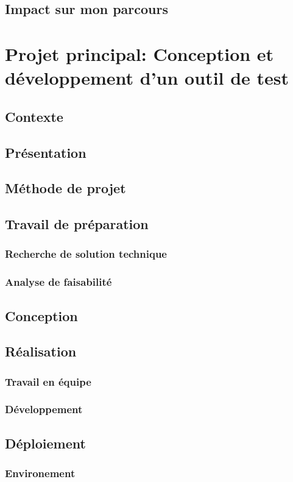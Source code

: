 \documentclass[12pt,a4paper]{report}
\begin{document}
\subsection{Impact sur mon parcours}

\newpage
\section{Projet principal: Conception et développement d'un outil de test}
\subsection{Contexte}
\subsection{Présentation}
\subsection{Méthode de projet}
\subsection{Travail de préparation}
\subsubsection{Recherche de solution technique}
\subsubsection{Analyse de faisabilité}
\subsection{Conception}
\subsection{Réalisation}
\subsubsection{Travail en équipe}
\subsubsection{Développement}
\subsection{Déploiement}
\subsubsection{Environement}
\end{document}
